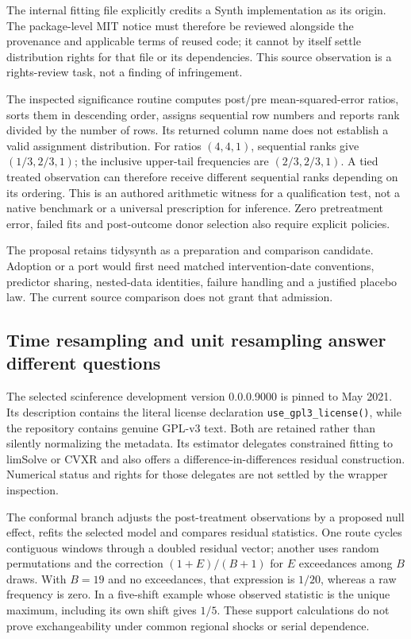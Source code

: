 The internal fitting file explicitly credits a Synth implementation as its
origin. The package-level MIT notice must therefore be reviewed alongside
the provenance and applicable terms of reused code; it cannot by itself
settle distribution rights for that file or its dependencies. This source
observation is a rights-review task, not a finding of infringement.
\citep{exec25_synthr_tidysynth,exec24_synth_source}

The inspected significance routine computes post/pre mean-squared-error
ratios, sorts them in descending order, assigns sequential row numbers and
reports rank divided by the number of rows. Its returned column name does
not establish a valid assignment distribution. For ratios $(4,4,1)$, sequential
ranks give $(1/3,2/3,1)$; the inclusive upper-tail frequencies are
$(2/3,2/3,1)$. A tied treated observation can therefore receive different
sequential ranks depending on its ordering. This is an authored arithmetic
witness for a qualification test, not a native benchmark or a universal
prescription for inference. Zero pretreatment error, failed fits and
post-outcome donor selection also require explicit policies.
\citep{exec25_synthr_tidysynth,exec25_synthr_choice}

The proposal retains tidysynth as a preparation and comparison candidate.
Adoption or a port would first need matched intervention-date conventions,
predictor sharing, nested-data identities, failure handling and a justified
placebo law. The current source comparison does not grant that admission.
\citep{exec25_synthr_choice}

\subsection{Time resampling and unit resampling answer different questions}
The selected scinference development version 0.0.0.9000 is pinned to May
2021. Its description contains the literal license declaration
\texttt{use\_gpl3\_license()}, while the repository contains genuine GPL-v3
text. Both are retained rather than silently normalizing the metadata.
Its estimator delegates constrained fitting to limSolve or CVXR and also
offers a difference-in-differences residual construction. Numerical status
and rights for those delegates are not settled by the wrapper inspection.
\citep{exec25_synthr_scinference}

The conformal branch adjusts the post-treatment observations by a proposed
null effect, refits the selected model and compares residual statistics.
One route cycles contiguous windows through a doubled residual vector; another
uses random permutations and the correction $(1+E)/(B+1)$ for $E$
exceedances among $B$ draws. With $B=19$ and no exceedances, that expression
is $1/20$, whereas a raw frequency is zero. In a five-shift example whose
observed statistic is the unique maximum, including its own shift gives
$1/5$. These support calculations do not prove exchangeability under common
regional shocks or serial dependence.\citep{exec25_synthr_scinference,
exec25_synthr_choice}


